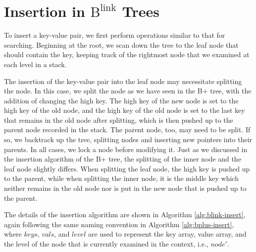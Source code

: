 \documentclass[11pt]{report}
\theoremstyle{definition}
\begin{document}
\section{Insertion in $\text{B}^{\text{link}}$ Trees}
\label{sec:blink-insert}

To insert a key-value pair, we first perform operations similar to that for searching. Beginning at the root, we scan down the tree to the leaf node that should contain the key, keeping track of the rightmost node that we examined at each level in a stack.

The insertion of the key-value pair into the leaf node may necessitate splitting the node. In this case, we split the node as we have seen in the B+ tree, with the addition of changing the high key. The high key of the new node is set to the high key of the old node, and the high key of the old node is set to the last key that remains in the old node after splitting, which is then pushed up to the parent node recorded in the stack. The parent node, too, may need to be split. If so, we backtrack up the tree, splitting nodes and inserting new pointers into their parents. In all cases, we lock a node before modifying it. Just as we discussed in the insertion algorithm of the B+ tree, the splitting of the inner node and the leaf node slightly differs. When splitting the leaf node, the high key is pushed up to the parent, while when splitting the inner node, it is the middle key which neither remains in the old node nor is put in the new node that is pushed up to the parent.

The details of the insertion algorithm are shown in Algorithm \ref{alg:blink-insert}, again following the same naming convention in Algorithm \ref{alg:bplus-insert}, where $keys$, $vals$, and $level$ are used to represent the key array, value array, and the level of the node that is currently examined in the context, i.e., $node'$.
\end{document}
